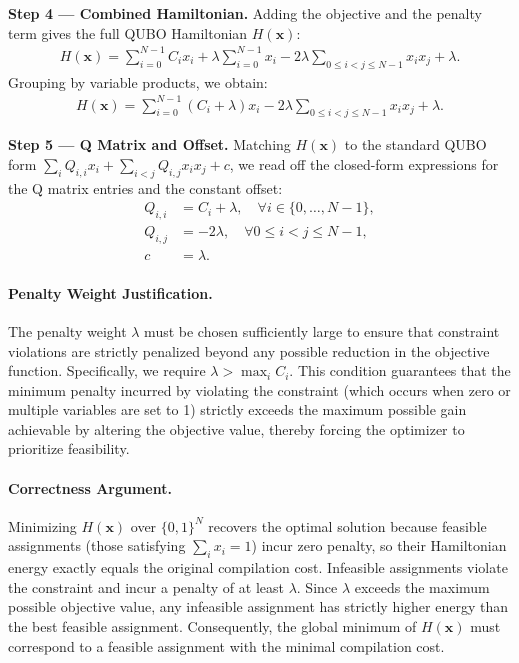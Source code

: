 \documentclass[12pt]{article}
\begin{document}
\textbf{Step 4 --- Combined Hamiltonian.} Adding the objective and the penalty term gives the full QUBO Hamiltonian $H(\mathbf{x})$:
\begin{align}
    H(\mathbf{x}) = \sum_{i=0}^{N-1} C_i x_i + \lambda \sum_{i=0}^{N-1} x_i - 2\lambda \sum_{0 \leq i < j \leq N-1} x_i x_j + \lambda.
\end{align}
Grouping by variable products, we obtain:
\begin{align}
    H(\mathbf{x}) = \sum_{i=0}^{N-1} (C_i + \lambda) x_i - 2\lambda \sum_{0 \leq i < j \leq N-1} x_i x_j + \lambda.
\end{align}

\textbf{Step 5 --- Q Matrix and Offset.} Matching $H(\mathbf{x})$ to the standard QUBO form $\sum_{i} Q_{i,i} x_i + \sum_{i < j} Q_{i,j} x_i x_j + c$, we read off the closed-form expressions for the Q matrix entries and the constant offset:
\begin{align}
    Q_{i,i} &= C_i + \lambda, \quad \forall i \in \{0, \dots, N-1\}, \\
    Q_{i,j} &= -2\lambda, \quad \forall 0 \leq i < j \leq N-1, \\
    c &= \lambda.
\end{align}

\paragraph{Penalty Weight Justification.}
The penalty weight $\lambda$ must be chosen sufficiently large to ensure that constraint violations are strictly penalized beyond any possible reduction in the objective function. Specifically, we require $\lambda > \max_{i} C_i$. This condition guarantees that the minimum penalty incurred by violating the constraint (which occurs when zero or multiple variables are set to 1) strictly exceeds the maximum possible gain achievable by altering the objective value, thereby forcing the optimizer to prioritize feasibility.

\paragraph{Correctness Argument.}
Minimizing $H(\mathbf{x})$ over $\{0,1\}^N$ recovers the optimal solution because feasible assignments (those satisfying $\sum_i x_i = 1$) incur zero penalty, so their Hamiltonian energy exactly equals the original compilation cost. Infeasible assignments violate the constraint and incur a penalty of at least $\lambda$. Since $\lambda$ exceeds the maximum possible objective value, any infeasible assignment has strictly higher energy than the best feasible assignment. Consequently, the global minimum of $H(\mathbf{x})$ must correspond to a feasible assignment with the minimal compilation cost.
\end{document}
